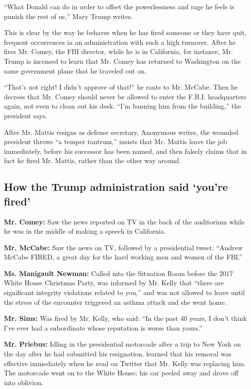 ``What Donald can do in order to offset the powerlessness and rage he
feels is punish the rest of us,'' Mary Trump writes.

This is clear by the way he behaves when he has fired someone or they
have quit, frequent occurrences in an administration with such a high
turnover. After he fires Mr. Comey, the FBI director, while he is in
California, for instance, Mr. Trump is incensed to learn that Mr. Comey
has returned to Washington on the same government plane that he traveled
out on.

``That's not right! I didn't approve of that!'' he rants to Mr. McCabe.
Then he decrees that Mr. Comey should never be allowed to enter the
F.B.I. headquarters again, not even to clean out his desk. ``I'm banning
him from the building,'' the president says.

After Mr. Mattis resigns as defense secretary, Anonymous writes, the
wounded president throws ``a temper tantrum,'' insists that Mr. Mattis
leave the job immediately, before his successor has been named, and then
falsely claims that in fact he fired Mr. Mattis, rather than the other
way around.

\hypertarget{how-the-trump-administration-said-youre-fired}{%
\subsection{How the Trump administration said `you're
fired'}\label{how-the-trump-administration-said-youre-fired}}

\textbf{Mr. Comey:} Saw the news reported on TV in the back of the
auditorium while he was in the middle of making a speech in California.

\textbf{Mr. McCabe:} Saw the news on TV, followed by a presidential
tweet: ``Andrew McCabe FIRED, a great day for the hard working men and
women of the FBI.''

\textbf{Ms. Manigault Newman:} Called into the Situation Room before the
2017 White House Christmas Party, was informed by Mr. Kelly that ``there
are significant integrity violations related to you,'' and was not
allowed to leave until the stress of the encounter triggered an asthma
attack and she went home.

\textbf{Mr. Sims:} Was fired by Mr. Kelly, who said: ``In the past 40
years, I don't think I've ever had a subordinate whose reputation is
worse than yours.''

\textbf{Mr. Priebus:} Idling in the presidential motorcade after a trip
to New York on the day after he had submitted his resignation, learned
that his removal was effective immediately when he read on Twitter that
Mr. Kelly was replacing him. The motorcade went on to the White House;
his car peeled away and drove off into oblivion.

